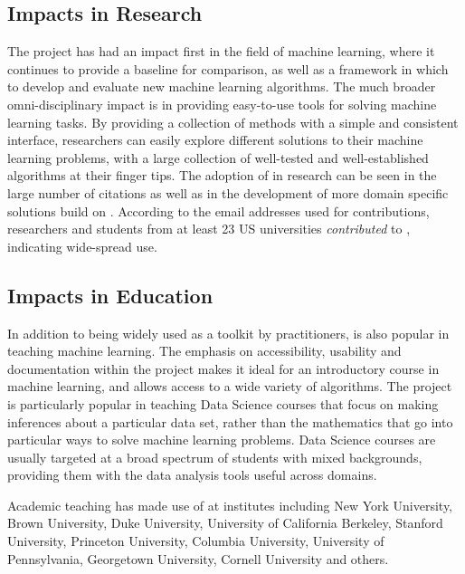 \subsection{Impacts in Research}
The \sklearn{} project has had an impact first in the field of machine learning,
where it continues to provide a baseline for comparison, as well as a
framework in which to develop and evaluate new machine learning algorithms.
The much broader omni-disciplinary impact is in providing easy-to-use
tools for solving machine learning tasks. By providing a collection
of methods with a simple and consistent interface, researchers
can easily explore different solutions to their machine learning problems,
with a large collection of well-tested and well-established algorithms
at their finger tips.
The adoption of \sklearn{} in research can be seen in the large number
of citations as well as in the development
of more domain specific solutions build on \sklearn{}.
According to the email addresses used for contributions, researchers and students
from at least 23 US universities \emph{contributed} to \sklearn{}, indicating wide-spread use.

\subsection{Impacts in Education}
In addition to being widely used as a toolkit by practitioners,
\sklearn{} is also popular in teaching machine learning.
The emphasis on accessibility, usability and documentation within
the \sklearn{} project makes it ideal for an introductory
course in machine learning, and allows access to a wide variety
of algorithms. The \sklearn{} project{} is particularly popular in teaching
Data Science courses that focus on making inferences about
a particular data set, rather than the mathematics that go into
particular ways to solve machine learning problems.
Data Science courses are usually targeted at a broad spectrum
of students with mixed backgrounds, providing them
with the data analysis tools useful across domains.

Academic teaching has made use of \sklearn{} at institutes including New York
University, Brown University, Duke University, University of California
Berkeley, Stanford University, Princeton University, Columbia University,
University of Pennsylvania, Georgetown University, Cornell University and
others.

